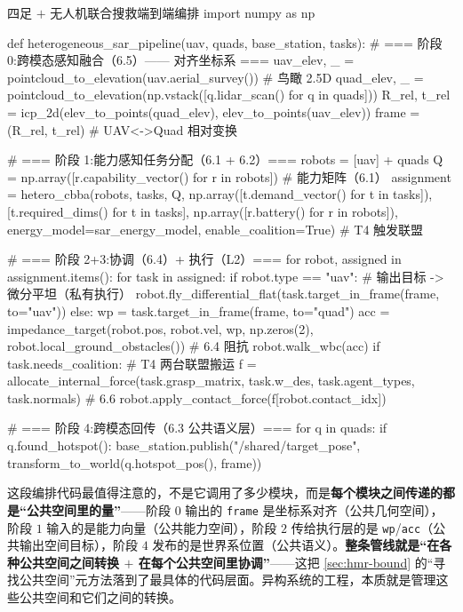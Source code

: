 \begin{codebox}[Python]{四足 $+$ 无人机联合搜救端到端编排}
import numpy as np

def heterogeneous_sar_pipeline(uav, quads, base_station, tasks):
    # === 阶段 0:跨模态感知融合（6.5）—— 对齐坐标系 ===
    uav_elev, _ = pointcloud_to_elevation(uav.aerial_survey())          # 鸟瞰 2.5D
    quad_elev, _ = pointcloud_to_elevation(np.vstack([q.lidar_scan() for q in quads]))
    R_rel, t_rel = icp_2d(elev_to_points(quad_elev), elev_to_points(uav_elev))
    frame = (R_rel, t_rel)                                              # UAV<->Quad 相对变换

    # === 阶段 1:能力感知任务分配（6.1 + 6.2）===
    robots = [uav] + quads
    Q = np.array([r.capability_vector() for r in robots])              # 能力矩阵（6.1）
    assignment = hetero_cbba(robots, tasks, Q,
                             np.array([t.demand_vector() for t in tasks]),
                             [t.required_dims() for t in tasks],
                             np.array([r.battery() for r in robots]),
                             energy_model=sar_energy_model, enable_coalition=True)  # T4 触发联盟

    # === 阶段 2+3:协调（6.4）+ 执行（L2）===
    for robot, assigned in assignment.items():
        for task in assigned:
            if robot.type == "uav":                                   # 输出目标 -> 微分平坦（私有执行）
                robot.fly_differential_flat(task.target_in_frame(frame, to="uav"))
            else:
                wp = task.target_in_frame(frame, to="quad")
                acc = impedance_target(robot.pos, robot.vel, wp, np.zeros(2),
                                       robot.local_ground_obstacles())  # 6.4 阻抗
                robot.walk_wbc(acc)
                if task.needs_coalition:                              # T4 两台联盟搬运
                    f = allocate_internal_force(task.grasp_matrix, task.w_des,
                                                task.agent_types, task.normals)  # 6.6
                    robot.apply_contact_force(f[robot.contact_idx])

    # === 阶段 4:跨模态回传（6.3 公共语义层）===
    for q in quads:
        if q.found_hotspot():
            base_station.publish("/shared/target_pose",
                                 transform_to_world(q.hotspot_pos(), frame))
\end{codebox}

\begin{insight}
这段编排代码最值得注意的，不是它调用了多少模块，而是\textbf{每个模块之间传递的都是“公共空间里的量”}——阶段 $0$ 输出的 \texttt{frame} 是坐标系对齐（公共几何空间），阶段 $1$ 输入的是能力向量（公共能力空间），阶段 $2$ 传给执行层的是 \texttt{wp}/\allowbreak\texttt{acc}（公共输出空间目标），阶段 $4$ 发布的是世界系位置（公共语义）。\textbf{整条管线就是“在各种公共空间之间转换 $+$ 在每个公共空间里协调”}——这把 \cref{sec:hmr-bound} 的“寻找公共空间”元方法落到了最具体的代码层面。异构系统的工程，本质就是管理这些公共空间和它们之间的转换。
\end{insight}

